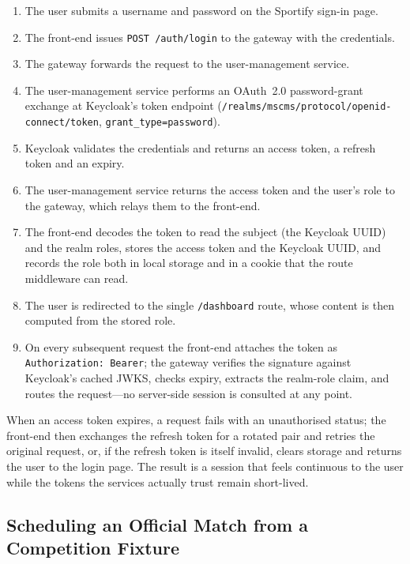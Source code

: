 \begin{enumerate}
  \item The user submits a username and password on the Sportify sign-in page.
  \item The front-end issues \texttt{POST /auth/login} to the gateway with the
  credentials.
  \item The gateway forwards the request to the user-management service.
  \item The user-management service performs an OAuth~2.0 password-grant exchange at
  Keycloak's token endpoint (\texttt{/realms/mscms/protocol/openid-connect/token},
  \texttt{grant\_type=password}).
  \item Keycloak validates the credentials and returns an access token, a refresh token
  and an expiry.
  \item The user-management service returns the access token and the user's role to the
  gateway, which relays them to the front-end.
  \item The front-end decodes the token to read the subject (the Keycloak UUID) and the
  realm roles, stores the access token and the Keycloak UUID, and records the role both
  in local storage and in a cookie that the route middleware can read.
  \item The user is redirected to the single \texttt{/dashboard} route, whose content is
  then computed from the stored role.
  \item On every subsequent request the front-end attaches the token as
  \texttt{Authorization: Bearer}; the gateway verifies the signature against Keycloak's
  cached JWKS, checks expiry, extracts the realm-role claim, and routes the request---no
  server-side session is consulted at any point.
\end{enumerate}

When an access token expires, a request fails with an unauthorised status; the
front-end then exchanges the refresh token for a rotated pair and retries the original
request, or, if the refresh token is itself invalid, clears storage and returns the user
to the login page. The result is a session that feels continuous to the user while the
tokens the services actually trust remain short-lived.

\subsection{Scheduling an Official Match from a Competition Fixture}
\label{sec:flow-schedule}

